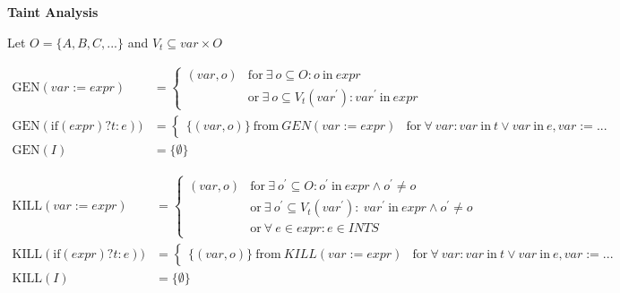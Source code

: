 \documentclass[11pt,letterpaper]{article}
\begin{document}
\centerline{\Large\bf Taint Analysis}
\hfill \par
\hfill \par


Let $O = \{A,B,C,...\}$ and $V_t \subseteq var \times O$


\begin{equation*}
  \begin{split}
  	\text{GEN}(var := expr) &= 
  	\begin{cases}
  	    (var, o) & \text{for}\ \exists\ o \subseteq O: o\ \text{in}\ expr \\
  		& \text{or}\ \exists\ o \subseteq V_t({var}^\prime): {var}^\prime\ \text{in}\ expr
  	\end{cases}\\ 
	\text{GEN}(\text{if}(expr)?t:e)) &=  	
  	\begin{cases}
		\{(var, o)\}\ \text{from}\ GEN(var := expr) & \text{for}\ \forall\ var: var\ \text{in}\ t \vee var\ \text{in}\ e, var := ...
    \end{cases} \\
  	\text{GEN}(I) &= \{\emptyset\}
   \end{split}
\end{equation*}

\begin{equation*}
  \begin{split}
  	\text{KILL}(var := expr) &= 
  	\begin{cases}
  		(var, o) & \text{for}\ \exists\ {o}^\prime \subseteq O: {o}^\prime\ \text{in}\ expr \wedge {o}^\prime \neq o \\
  		& \text{or}\ \exists\ {o}^\prime \subseteq V_t({var}^\prime):\ {var}^\prime\ \text{in}\ expr \wedge {o}^\prime \neq o \\
  		& \text{or}\ \forall\ e \in expr: e \in INTS
  	\end{cases}\\ 
	\text{KILL}(\text{if}(expr)?t:e)) &=  	
  	\begin{cases}
		\{(var, o)\}\ \text{from}\ KILL(var := expr) & \text{for}\ \forall\ var: var\ \text{in}\ t \vee var\ \text{in}\ e, var := ...
    \end{cases} \\
  	\text{KILL}(I) &= \{\emptyset\}
   \end{split}
\end{equation*}
\end{document}
